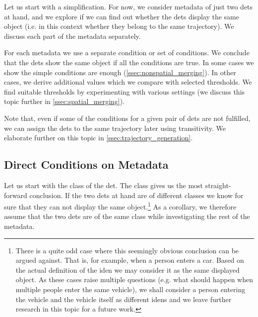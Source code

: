 Let us start with a simplification. For now, we consider metadata of just two \glspl{det} at hand, and we explore if we can find out whether the \glspl{det} display the same object (i.e. in this context whether they belong to the same trajectory). We discuss each part of the metadata separately.

For each metadata we use a separate condition or set of conditions. We conclude that the \glspl{det} show the same object if all the conditions are true. In some cases we show the simple conditions are enough (\autoref{ssec:nonspatial_merging}). In other cases, we derive additional values which we compare with selected thresholds. We find suitable thresholds by experimenting with various settings (we discuss this topic further in \autoref{ssec:spatial_merging}).

Note that, even if some of the conditions for a given pair of \glspl{det} are not fulfilled, we can assign the \glspl{det} to the same trajectory later using transitivity. We elaborate further on this topic in \autoref{ssec:trajectory_generation}.

\subsection{Direct Conditions on Metadata}

\label{ssec:nonspatial_merging}

Let us start with the class of the \gls{det}. The class
gives us the most straight-forward conclusion.
If the two \glspl{det} at hand are of different classes we know for sure
that they can not display the same
object.\footnote{There is a quite
odd case where this seemingly obvious conclusion can be argued against. That
is, for example, when a person enters a car. Based on the actual definition of
the \gls{iden} we may consider it as the same displayed object. As these cases
raise multiple questions (e.g. what should happen when multiple people enter the same vehicle), we shall consider a person entering the vehicle and the vehicle itself as different
\glspl{iden} and we leave further research in this topic for a
future work.} As a corollary, we therefore assume that the two \glspl{det} are
of the same class while investigating the rest of the metadata.

